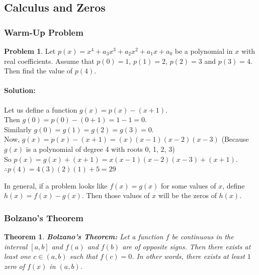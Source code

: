 \documentclass[14]{article}
\newtheorem{theorem}{Theorem}
\theoremstyle{definition}
\newtheorem{prob}{Problem}
\begin{document}
\subsection{Calculus and Zeros}
\subsubsection{Warm-Up Problem}
\begin{prob}
Let $p(x) = x^4 + a_3x^3 + a_2 x^2 + a_1x + a_0$ be a polynomial in $x$ with real coefficients. Assume that $p(0) = 1$, $p(1) = 2$, $p(2) = 3$ and $p(3) = 4$. Then find the value of $p(4)$.
\paragraph{Solution:} Let us define a function $g(x) = p(x) - (x + 1)$.\\
Then $g(0) = p(0) - (0 + 1) = 1 - 1 = 0$.\\
Similarly $g(0) = g(1) = g(2) = g(3) = 0$.\\
Now, $g(x) =  p(x) - (x + 1) = (x)(x-1)(x-2)(x-3)$ (Because $g(x)$ is a polynomial of degree 4 with roots 0, 1, 2, 3)\\
So $p(x) = g(x) + (x +1) = x(x-1)(x-2)(x-3) + (x + 1) $.\\  
$\therefore p(4) = 4(3)(2)(1) + 5 = 29$
\end{prob}
In general, if a problem looks like $f(x) = g(x)$ for some values of $x$, define $h(x) = f(x) - g(x).$ Then those values of $x$ will be the zeros of $h(x)$.
\subsubsection{Bolzano's Theorem}
\begin{theorem}
\textbf{Bolzano's Theorem:} Let a function $f$ be continuous in the interval $[a, b]$ and $f(a)$ and $f(b)$ are of opposite signs. Then there exists at least one $c \in (a, b)$ such that $f(c) = 0$. In other words, there exists at least $1$ zero of $f(x)$ in $(a, b)$.
\end{theorem}
\end{document}
